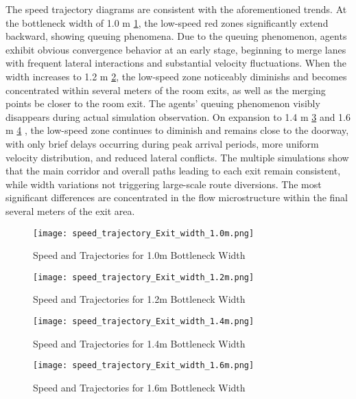 The speed trajectory diagrams are consistent with the aforementioned trends. At the bottleneck width of 1.0 m \ref{fig:speed_trajectory_layout_1.0m}, the low-speed red zones significantly extend backward, showing queuing phenomena. Due to the queuing phenomenon, agents exhibit obvious convergence behavior at an early stage, beginning to merge lanes with frequent lateral interactions and substantial velocity fluctuations. When the width increases to 1.2 m \ref{fig:speed_trajectory_layout_1.2m}, the low-speed zone noticeably diminishs and becomes concentrated within several meters of the room exits, as well as the merging points be closer to the room exit. The agents' queuing phenomenon visibly disappears during actual simulation observation. On expansion to 1.4 m \ref{fig:speed_trajectory_layout_1.4m} and 1.6 m \ref{fig:speed_trajectory_layout_1.6m} , the low-speed zone continues to diminish and remains close to the doorway, with only brief delays occurring during peak arrival periods, more uniform velocity distribution, and reduced lateral conflicts. The multiple simulations show that the main corridor and overall paths leading to each exit remain consistent, while width variations not triggering large-scale route diversions. The most significant differences are concentrated in the flow microstructure within the final several meters of the exit area.
\begin{figure}[h]
    \centering
    \texttt{[image: speed\_trajectory\_Exit\_width\_1.0m.png]}
    \caption{Speed and Trajectories for 1.0m Bottleneck Width}
    \label{fig:speed_trajectory_layout_1.0m}
\end{figure}
\begin{figure}[h]
    \centering
    \texttt{[image: speed\_trajectory\_Exit\_width\_1.2m.png]}
    \caption{Speed and Trajectories for 1.2m Bottleneck Width}
    \label{fig:speed_trajectory_layout_1.2m}
\end{figure}
\begin{figure}[h]
    \centering
    \texttt{[image: speed\_trajectory\_Exit\_width\_1.4m.png]}
    \caption{Speed and Trajectories for 1.4m Bottleneck Width}
    \label{fig:speed_trajectory_layout_1.4m}
\end{figure}
\begin{figure}[h]
    \centering
    \texttt{[image: speed\_trajectory\_Exit\_width\_1.6m.png]}
    \caption{Speed and Trajectories for 1.6m Bottleneck Width}
    \label{fig:speed_trajectory_layout_1.6m}
\end{figure}

